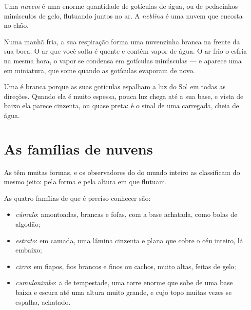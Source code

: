 \begin{definition}\label{def:g4:clouds-rain-snow:cloud}
Uma \emph{nuvem} é uma enorme quantidade de gotículas de água,
ou de pedacinhos minúsculos de gelo, flutuando juntos no ar. A
\emph{neblina} é uma nuvem que encosta no chão.
\end{definition}

\begin{example}\label{ex:g4:clouds-rain-snow:breath}
Numa manhã fria, a sua respiração forma uma nuvenzinha branca na frente
da sua boca. O ar que você solta é quente e contém vapor de água. O ar
frio o esfria na mesma hora, o vapor se condensa em gotículas minúsculas
--- e aparece uma  em miniatura, que some quando as gotículas
evaporam de novo.
\end{example}

Uma  é branca porque as suas gotículas espalham a luz do Sol em todas
as direções. Quando ela é muito espessa, pouca luz chega até a sua base, e
vista de baixo ela parece cinzenta, ou quase preta: é o sinal de uma 
carregada, cheia de água.

\section{As famílias de nuvens}

As  têm muitas formas, e os observadores do  do mundo inteiro
as classificam do mesmo jeito: pela forma e pela altura em que flutuam.

\begin{definition}\label{def:g4:clouds-rain-snow:cloud-families}
As quatro famílias de  que é preciso conhecer são:
\begin{itemize}
  \item \emph{cúmulo}:  amontoadas, brancas e fofas,
        com a base achatada, como bolas de algodão;
  \item \emph{estrato}:  em camada, uma lâmina cinzenta
        e plana que cobre o céu inteiro, lá embaixo;
  \item \emph{cirro}:  em fiapos, fios brancos e finos ou
        cachos, muito altas, feitas de gelo;
  \item \emph{cumulonimbo}: a  de tempestade, uma
        torre enorme que sobe de uma base baixa e escura até uma altura
        muito grande, e cujo topo muitas vezes se espalha, achatado.
\end{itemize}
\end{definition}

